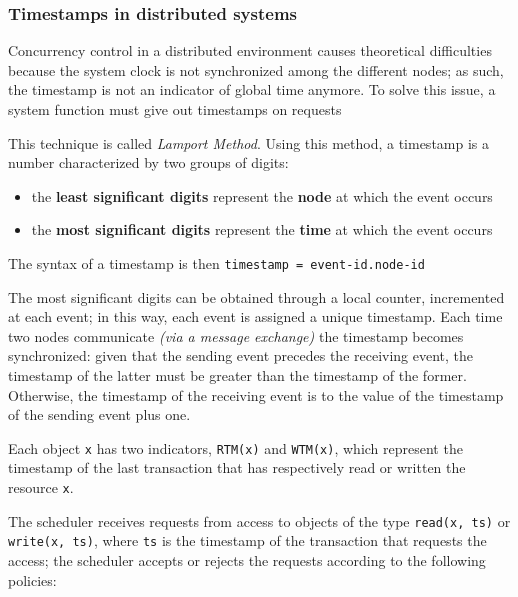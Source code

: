 \documentclass[english]{article}
\begin{document}
\subsubsection{Timestamps in distributed systems}

Concurrency control in a distributed environment causes theoretical difficulties because the system clock is not synchronized among the different nodes;
as such, the timestamp is not an indicator of global time anymore.
To solve this issue, a system function must give out timestamps on requests

This technique is called \textit{Lamport Method}.
Using this method, a timestamp is a number characterized by two groups of digits:

\begin{itemize}
  \item the \textbf{least significant digits} represent the \textbf{node} at which the event occurs
  \item the \textbf{most significant digits} represent the \textbf{time} at which the event occurs
\end{itemize}

The syntax of a timestamp is then \texttt{timestamp = event-id.node-id}

\bigskip
The most significant digits can be obtained through a local counter, incremented at each event; in this way, each event is assigned a unique timestamp.
Each time two nodes communicate \textit{(via a message exchange)} the timestamp becomes synchronized: given that the sending event precedes the receiving event, the timestamp of the latter must be greater than the timestamp of the former.
Otherwise, the timestamp of the receiving event is  to the value of the timestamp of the sending event plus one.

\bigskip
Each object \texttt{x} has two indicators, \texttt{RTM(x)} and \texttt{WTM(x)}, which represent the timestamp of the last transaction that has respectively read or written the resource \texttt{x}.

The scheduler receives requests from access to objects of the type \texttt{read(x, ts)} or \texttt{write(x, ts)}, where \texttt{ts} is the timestamp of the transaction that requests the access; the scheduler accepts or rejects the requests according to the following policies:
\end{document}
